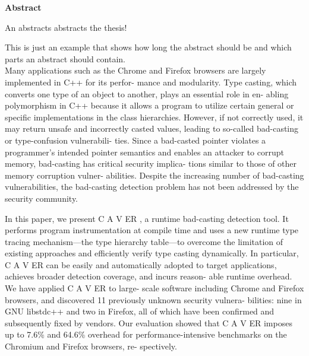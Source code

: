 

\clearemptydoublepage
{}
{}	

\vspace*{2cm}
\begin{center}
{\Large \bf Abstract}
\end{center}
\vspace{1cm}

An abstracts abstracts the thesis!

This is just an example that shows how long the abstract should be
and which parts an abstract should contain. \\


Many applications such as the Chrome and Firefox
browsers are largely implemented in C++ for its perfor-
mance and modularity. Type casting, which converts one
type of an object to another, plays an essential role in en-
abling polymorphism in C++ because it allows a program
to utilize certain general or specific implementations in
the class hierarchies. However, if not correctly used, it
may return unsafe and incorrectly casted values, leading
to so-called bad-casting or type-confusion vulnerabili-
ties. Since a bad-casted pointer violates a programmer’s
intended pointer semantics and enables an attacker to
corrupt memory, bad-casting has critical security implica-
tions similar to those of other memory corruption vulner-
abilities. Despite the increasing number of bad-casting
vulnerabilities, the bad-casting detection problem has not
been addressed by the security community.

In this paper, we present C A V ER , a runtime bad-casting
detection tool. It performs program instrumentation
at compile time and uses a new runtime type tracing
mechanism—the type hierarchy table—to overcome the
limitation of existing approaches and efficiently verify
type casting dynamically. In particular, C A V ER can be
easily and automatically adopted to target applications,
achieves broader detection coverage, and incurs reason-
able runtime overhead. We have applied C A V ER to large-
scale software including Chrome and Firefox browsers,
and discovered 11 previously unknown security vulnera-
bilities: nine in GNU libstdc++ and two in Firefox, all
of which have been confirmed and subsequently fixed by
vendors. Our evaluation showed that C A V ER imposes up
to 7.6\% and 64.6\% overhead for performance-intensive
benchmarks on the Chromium and Firefox browsers, re-
spectively.